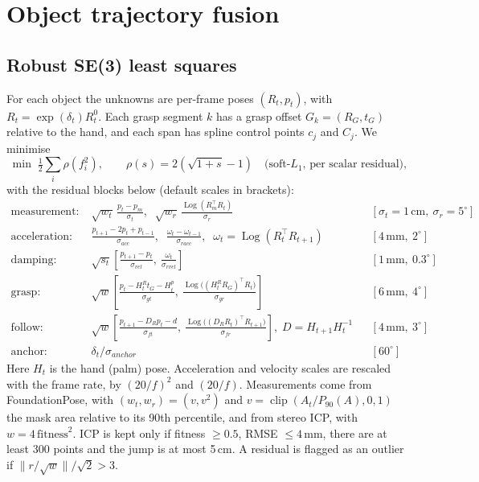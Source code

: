 \documentclass[10pt,a4paper]{article}
\newcommand{\Log}{\operatorname{Log}}
\newcommand{\clip}{\operatorname{clip}}
\begin{document}
\section{Object trajectory fusion}
\subsection{Robust SE(3) least squares}
For each object the unknowns are per-frame poses $(R_t,p_t)$, with $R_t=\exp(\delta_t)R_t^0$. Each grasp
segment $k$ has a grasp offset $G_k=(R_G,t_G)$ relative to the hand, and each span has spline control points $c_j$
and $C_j$. We minimise
\begin{equation}
\min\;\tfrac12\sum_i \rho\!\left(f_i^2\right),\qquad \rho(s)=2\left(\sqrt{1+s}-1\right)\quad\text{(soft-}L_1\text{, per scalar residual)},
\end{equation}
with the residual blocks below (default scales in brackets):
\begin{align}
\text{measurement:}\;& \sqrt{w_t}\,\frac{p_t-p_m}{\sigma_t},\;\; \sqrt{w_r}\,\frac{\Log(R_m^\top R_t)}{\sigma_r}
 && [\sigma_t{=}1\,\text{cm},\ \sigma_r{=}5^\circ]\\
\text{acceleration:}\;& \frac{p_{t+1}-2p_t+p_{t-1}}{\sigma_{acc}},\;\; \frac{\omega_t-\omega_{t-1}}{\sigma_{racc}},\;\; \omega_t=\Log(R_t^\top R_{t+1})
 && [4\,\text{mm},\ 2^\circ]\\
\text{damping:}\;& \sqrt{s_t}\left[\frac{p_{t+1}-p_t}{\sigma_{vel}},\ \frac{\omega_t}{\sigma_{rvel}}\right]
 && [1\,\text{mm},\ 0.3^\circ]\\
\text{grasp:}\;& \sqrt{w}\left[\frac{p_t-H^R_t t_G-H^p_t}{\sigma_{gt}},\ \frac{\Log\!\big((H^R_tR_G)^\top R_t\big)}{\sigma_{gr}}\right]
 && [6\,\text{mm},\ 4^\circ]\\
\text{follow:}\;& \sqrt{w}\left[\frac{p_{t+1}-D_Rp_t-d}{\sigma_{ft}},\ \frac{\Log\!\big((D_RR_t)^\top R_{t+1}\big)}{\sigma_{fr}}\right],\; D=H_{t+1}H_t^{-1}
 && [4\,\text{mm},\ 3^\circ]\\
\text{anchor:}\;& \delta_t/\sigma_{anchor} && [60^\circ]
\end{align}
Here $H_t$ is the hand (palm) pose. Acceleration and velocity scales are rescaled with the frame rate, by $(20/f)^2$ and $(20/f)$.
Measurements come from FoundationPose, with $(w_t,w_r)=(v,v^2)$ and $v=\clip(A_t/P_{90}(A),0,1)$ the mask area relative to its 90th percentile,
and from stereo ICP, with $w=4\,\mathrm{fitness}^2$. ICP is kept only if fitness $\ge 0.5$, RMSE $\le 4$\,mm, there are at least 300 points and the jump is at most 5\,cm.
A residual is flagged as an outlier if $\|r/\sqrt w\|/\sqrt2>3$.
\end{document}
